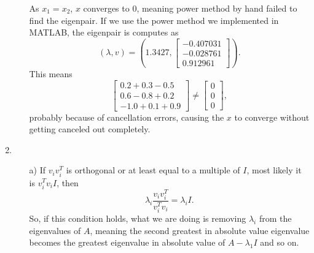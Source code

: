 \documentclass[10pt,a4paper, margin=1in]{article}
\begin{document}
\begin{enumerate}
\begin{enumerate}
    	As $x_1=x_2$, $x$ converges to $0$, meaning power method by hand failed to find the eigenpair. If we use the power method we implemented in MATLAB, the eigenpair is computes as $$(\lambda,v)=\left(1.3427, \begin{bmatrix} -0.407031\\ -0.028761\\ 0.912961\end{bmatrix}\right).$$
    	This means $$\begin{bmatrix} 0.2+0.3-0.5\\0.6-0.8+0.2\\-1.0+0.1+0.9 \end{bmatrix} \neq \begin{bmatrix} 0\\0\\0 \end{bmatrix},$$ probably because of cancellation errors, causing the $x$ to converge without getting canceled out completely.
    \end{enumerate}
    	
    \item %
     	\begin{enumerate}
     		\item[a)]
     		If $v_iv_i^T$ is orthogonal or at least equal to a multiple of $I$, most likely it is $v_i^Tv_iI$, then $$\lambda_i\frac{v_iv_i^T}{v_i^Tv_i} = \lambda_i I.$$ So, if this condition holds, what we are doing is removing $\lambda_i$ from the eigenvalues of $A$, meaning the second greatest in absolute value eigenvalue becomes the greatest eigenvalue in absolute value of $A-\lambda_1 I$ and so on. 
     		

\end{enumerate}
\end{enumerate}
\end{document}
